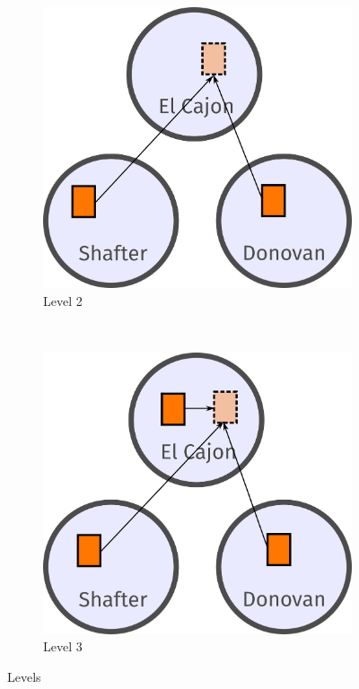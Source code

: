 \documentclass[journal abbreviation, manuscript]{copernicus}
\begin{document}
\begin{figure}
~
\begin{subfigure}{0.23\textwidth}
\includegraphics[width=\textwidth]{writeup/img/level2.png}
\caption{Level 2}
\end{subfigure}
~
\begin{subfigure}{0.23\textwidth}
\includegraphics[width=\textwidth]{writeup/img/level3.png}
\caption{Level 3}
\end{subfigure}
\caption{Levels}
\end{figure}
\end{document}

